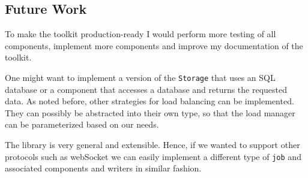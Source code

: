\subsection{Future Work}
To make the toolkit production-ready I would perform more testing of all
components, implement more components and improve my documentation
of the toolkit. 

One might want to implement a version of the \texttt{Storage}
that uses an SQL database or a component that accesses a database and 
returns the requested data. As noted before, other strategies 
for load balancing can be implemented. 
They can possibly be abstracted into their own type, so that the
load manager can be parameterized based on our needs.

The library is very general and extensible. Hence, if we wanted to support 
other protocols such as webSocket we can easily implement a different 
type of \texttt{job} and associated components and writers in similar fashion.

